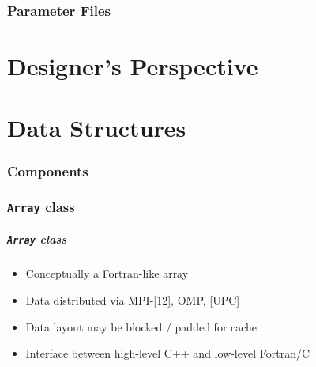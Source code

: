 \documentclass{beamer}
\newcommand{\code}[1]{\texttt{#1}}
\begin{document}
\section{Parameter Files}


\part{Designer's Perspective}

\part{Data Structures}

\section{Components}


\section{\code{Array} class}

\begin{frame}
\frametitle{\code{Array} class}

\begin{itemize}
\item Conceptually a Fortran-like array
\item Data distributed via MPI-[12], OMP, [UPC]
\item Data layout may be blocked / padded for cache
\item Interface between high-level C++ and low-level Fortran/C
\end{itemize}
\end{frame}
\end{document}

